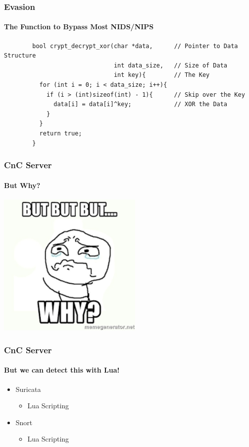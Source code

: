 \documentclass[aspectratio=169]{beamer}
\begin{document}
\begin{frame}[fragile]{}
  \frametitle{Evasion}
  \framesubtitle{The Function to Bypass Most NIDS/NIPS}
  \begin{center}
    \begin{tcolorbox}[title=net.c,colback=black]
    \begin{minipage}{0.5\textwidth}
      \begin{verbatim}
        bool crypt_decrypt_xor(char *data,      // Pointer to Data Structure
                               int data_size,   // Size of Data
                               int key){        // The Key
          for (int i = 0; i < data_size; i++){ 
            if (i > (int)sizeof(int) - 1){      // Skip over the Key
              data[i] = data[i]^key;            // XOR the Data
            }
          }
          return true;
        }
      \end{verbatim}
    \end{minipage}
    \end{tcolorbox}
  \end{center}
\end{frame}

\begin{frame}
  \frametitle{CnC Server}
  \framesubtitle{But Why?}
  \begin{center}
    \includegraphics[width=7cm,keepaspectratio]{but_why}
  \end{center}
\end{frame}

\begin{frame}
  \frametitle{CnC Server}
  \framesubtitle{But we can detect this with Lua!}
  \begin{itemize}
  \item{Suricata}
    \begin{itemize}
    \item{Lua Scripting}
    \end{itemize}
  \item{Snort}
    \begin{itemize}
    \item{Lua Scripting}
    \end{itemize}
  \end{itemize}
\end{frame}
\end{document}
